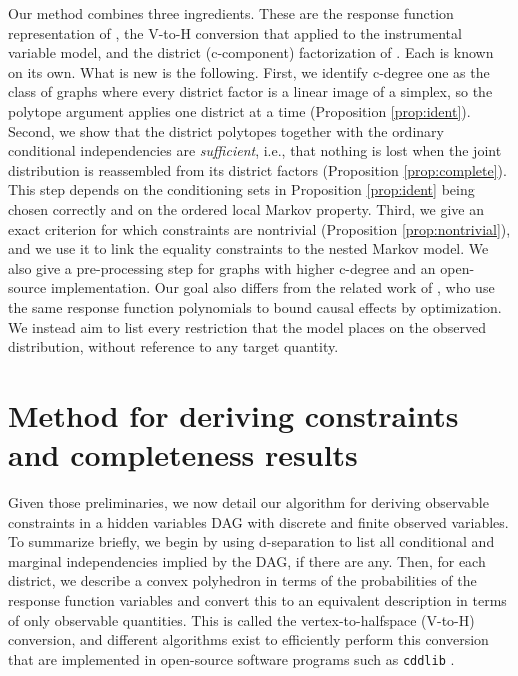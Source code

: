 \documentclass[12pt]{article}
\begin{document}
Our method combines three ingredients. These are the response function representation of \citet{balke1994counterfactual}, the V-to-H conversion that \citet{bonet2001instrumentality} applied to the instrumental variable model, and the district (c-component) factorization of \citet{tian2002identification, tian2002testable}. Each is known on its own. What is new is the following. First, we identify c-degree one as the class of graphs where every district factor is a linear image of a simplex, so the polytope argument applies one district at a time (Proposition \ref{prop:ident}). Second, we show that the district polytopes together with the ordinary conditional independencies are \emph{sufficient}, i.e., that nothing is lost when the joint distribution is reassembled from its district factors (Proposition \ref{prop:complete}). This step depends on the conditioning sets in Proposition \ref{prop:ident} being chosen correctly and on the ordered local Markov property. Third, we give an exact criterion for which constraints are nontrivial (Proposition \ref{prop:nontrivial}), and we use it to link the equality constraints to the nested Markov model. We also give a pre-processing step for graphs with higher c-degree and an open-source implementation. Our goal also differs from the related work of \citet{duarte2023automated}, who use the same response function polynomials to bound causal effects by optimization. We instead aim to list every restriction that the model places on the observed distribution, without reference to any target quantity.



\section{Method for deriving constraints and completeness results}

Given those preliminaries, we now detail our algorithm for deriving observable constraints in a hidden variables DAG with discrete and finite observed variables. To summarize briefly, we begin by using d-separation to list all conditional and marginal independencies implied by the DAG, if there are any. Then, for each district, we describe a convex polyhedron in terms of the probabilities of the response function variables and convert this to an equivalent description in terms of only observable quantities. This is called the vertex-to-halfspace (V-to-H) conversion, and different algorithms exist to efficiently perform this conversion that are implemented in open-source software programs such as \texttt{cddlib} \citep{cdd}.
\end{document}
